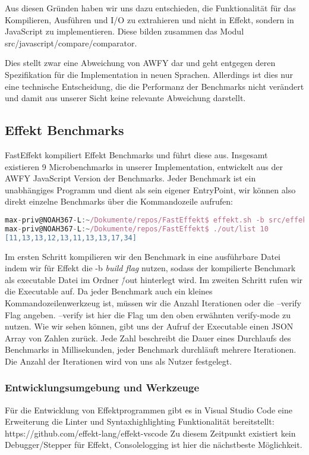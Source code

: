 Aus diesen Gründen haben wir uns dazu entschieden, die Funktionalität für das Kompilieren, Ausführen und I/O zu extrahieren und nicht in Effekt, sondern in JavaScript zu implementieren. Diese bilden zusammen das Modul src/javascript/compare/comparator.

Dies stellt zwar eine Abweichung von AWFY dar und geht entgegen deren Spezifikation für die Implementation in neuen Sprachen. Allerdings ist dies nur eine technische Entscheidung, die die Performanz der Benchmarks nicht verändert und damit aus unserer Sicht keine relevante Abweichung darstellt.

\subsection{Effekt Benchmarks}
FastEffekt kompiliert Effekt Benchmarks und führt diese aus. Insgesamt existieren 9 Microbenchmarks in unserer Implementation, entwickelt aus der AWFY JavaScript Version der Benchmarks.
Jeder Benchmark ist ein unabhängiges Programm und dient als sein eigener EntryPoint, wir können also direkt einzelne Benchmarks über die Kommandozeile aufrufen:
\begin{lstlisting}[language=javascript]
max-priv@NOAH367-L:~/Dokumente/repos/FastEffekt$ effekt.sh -b src/effekt/benchmark/list.effekt 
max-priv@NOAH367-L:~/Dokumente/repos/FastEffekt$ ./out/list 10
[11,13,13,12,13,11,13,13,17,34]
\end{lstlisting}
Im ersten Schritt kompilieren wir den Benchmark in eine ausführbare Datei indem wir für Effekt die -b \textit{build flag} nutzen, sodass der kompilierte Benchmark als executable Datei im Ordner \./out hinterlegt wird. Im zweiten Schritt rufen wir die Executable auf. Da jeder Benchmark auch ein kleines Kommandozeilenwerkzeug ist, müssen wir die Anzahl Iterationen oder die --verify Flag angeben. --verify ist hier die Flag um den %
oben erwähnten verify-mode zu nutzen.
Wie wir sehen können, gibt uns der Aufruf der Executable einen JSON Array von Zahlen zurück. Jede Zahl beschreibt die Dauer eines Durchlaufs des Benchmarks in Millisekunden, jeder Benchmark durchläuft mehrere Iterationen. Die Anzahl der Iterationen wird von uns als Nutzer festgelegt.

\subsubsection{Entwicklungsumgebung und Werkzeuge}
Für die Entwicklung von Effektprogrammen gibt es in Visual Studio Code eine Erweiterung die Linter und Syntaxhighlighting Funktionalität bereitstellt:
https://github.com/effekt-lang/effekt-vscode
Zu diesem Zeitpunkt existiert kein Debugger/Stepper für Effekt, Consolelogging ist hier die nächstbeste Möglichkeit.

